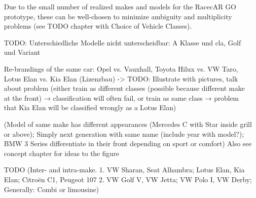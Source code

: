 Due to the small number of realized makes and models for the RacecAR GO prototype, these can be well-chosen to minimize ambiguity and multiplicity problems (see TODO chapter with Choice of Vehicle Classes).

TODO: Unterschiedliche Modelle nicht unterscheidbar:
A Klasse und cla, Golf und Variant

Re-brandings of the same car: Opel vs. Vauxhall, Toyota Hilux vs. VW Taro, Lotus Elan vs. Kia Elan (Lizenzbau) -> TODO: Illustrate with pictures, talk about problem (either train as different classes (possible because different make at the front) → classification will often fail, or train as same class → problem that Kia Elan will be classified wrongly as a Lotus Elan)

(Model of same make has different appearances (Mercedes C with Star inside grill or above); Simply next generation with same name (include year with model?); BMW 3 Series differentiate in their front depending on sport or comfort) Also see concept chapter for ideas to the figure

TODO (Inter- and intra-make.
1. VW Sharan, Seat Alhambra; Lotus Elan, Kia Elan; Citroën C1, Peugeot 107 2. VW Golf V, VW Jetta; VW Polo I, VW Derby; Generally: Combi or limousine)

